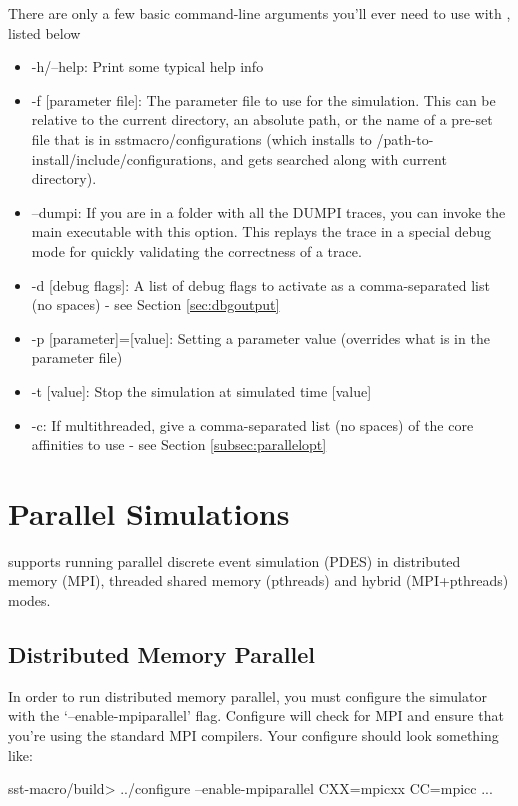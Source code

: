 There are only a few basic command-line arguments you'll ever need to use with \sstmacro, listed below

\begin{itemize}
\item -h/--help: Print some typical help info
\item -f [parameter file]: The parameter file to use for the simulation.  
This can be relative to the current directory, an absolute path, or the name of a pre-set file that is in sstmacro/configurations 
(which installs to /path-to-install/include/configurations, and gets searched along with current directory). 
\item --dumpi: If you are in a folder with all the DUMPI traces, you can invoke the main  executable with this option.  This replays the trace in a special debug mode for quickly validating the correctness of a trace.
\item -d [debug flags]: A list of debug flags to activate as a comma-separated list (no spaces) - see Section \ref{sec:dbgoutput}
\item -p [parameter]=[value]: Setting a parameter value (overrides what is in the parameter file)
\item -t [value]: Stop the simulation at simulated time [value]
\item -c: If multithreaded, give a comma-separated list (no spaces) of the core affinities to use - see Section \ref{subsec:parallelopt}
\end{itemize}

\section{Parallel Simulations}
\label{sec:PDES}

\sstmacro supports running parallel discrete event simulation (PDES) in distributed memory (MPI), threaded shared memory (pthreads) and hybrid (MPI+pthreads) modes.  

\subsection{Distributed Memory Parallel}
\label{subsec:mpiparallel}
In order to run distributed memory parallel, you must configure the simulator with the `--enable-mpiparallel' flag.
Configure will check for MPI and ensure that you're using
the standard MPI compilers.  Your configure should look something like:

\begin{ShellCmd}
sst-macro/build> ../configure --enable-mpiparallel CXX=mpicxx CC=mpicc ...
\end{ShellCmd}

